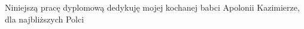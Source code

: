 \newpage %
Niniejszą  pracę dyplomową dedykuję mojej kochanej babci Apolonii Kazimierze, dla najbliższych Polci